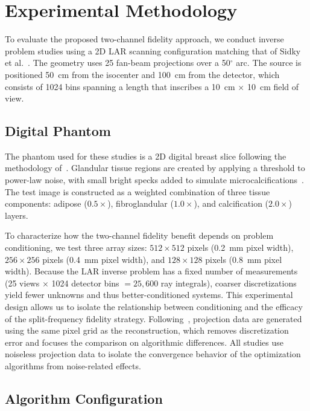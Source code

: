 \documentclass[journal, a4paper]{IEEEtran}
\begin{document}
\section{Experimental Methodology}

To evaluate the proposed two-channel fidelity approach, we conduct inverse problem studies using a 2D LAR scanning configuration matching that of Sidky et al.~\cite{sidky2025accurate}. The geometry uses 25 fan-beam projections over a 50$^\circ$ arc. The source is positioned 50~cm from the isocenter and 100~cm from the detector, which consists of 1024 bins spanning a length that inscribes a 10~cm $\times$ 10~cm field of view.

\subsection{Digital Phantom}

The phantom used for these studies is a 2D digital breast slice following the methodology of~\cite{sidky2025accurate}. Glandular tissue regions are created by applying a threshold to power-law noise, with small bright specks added to simulate microcalcifications~\cite{reiser2010task}. The test image is constructed as a weighted combination of three tissue components: adipose ($0.5\times$), fibroglandular ($1.0\times$), and calcification ($2.0\times$) layers.

To characterize how the two-channel fidelity benefit depends on problem conditioning, we test three array sizes: $512 \times 512$ pixels (0.2~mm pixel width), $256 \times 256$ pixels (0.4~mm pixel width), and $128 \times 128$ pixels (0.8~mm pixel width). Because the LAR inverse problem has a fixed number of measurements (25 views $\times$ 1024 detector bins $= 25{,}600$ ray integrals), coarser discretizations yield fewer unknowns and thus better-conditioned systems. This experimental design allows us to isolate the relationship between conditioning and the efficacy of the split-frequency fidelity strategy. Following~\cite{sidky2025accurate}, projection data are generated using the same pixel grid as the reconstruction, which removes discretization error and focuses the comparison on algorithmic differences. All studies use noiseless projection data to isolate the convergence behavior of the optimization algorithms from noise-related effects.

\subsection{Algorithm Configuration}
\end{document}

